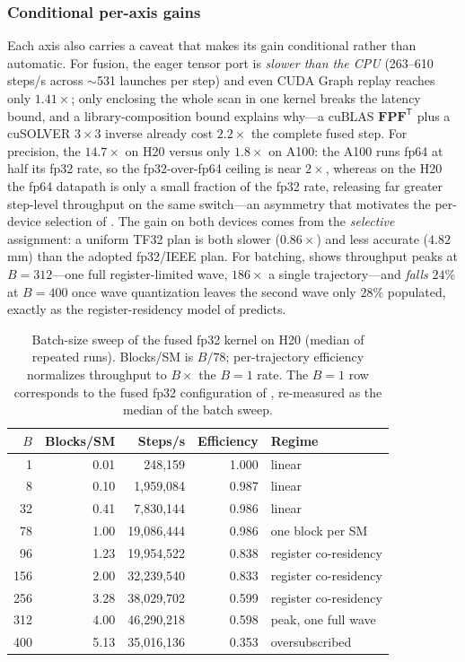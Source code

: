 \subsubsection{Conditional per-axis gains}
Each axis also carries a caveat that makes its gain conditional rather than automatic. For fusion, the eager tensor port is \emph{slower than the CPU} (263--610 steps/s across $\sim$531 launches per step) and even CUDA Graph replay reaches only $1.41\times$; only enclosing the whole scan in one kernel breaks the latency bound, and a library-composition bound explains why---a cuBLAS $\mathbf{F}\mathbf{P}\mathbf{F}^{\mathsf T}$ plus a cuSOLVER $3\times3$ inverse already cost $2.2\times$ the complete fused step. For precision, the $14.7\times$ on H20 versus only $1.8\times$ on A100: the A100 runs fp64 at half its fp32 rate, so the fp32-over-fp64 ceiling is near $2\times$, whereas on the H20 the fp64 datapath is only a small fraction of the fp32 rate, releasing far greater step-level throughput on the same switch---an asymmetry that motivates the per-device selection of . The gain on both devices comes from the \emph{selective} assignment: a uniform TF32 plan is both slower ($0.86\times$) and less accurate ($4.82$\,mm) than the adopted fp32/IEEE plan. For batching,  shows throughput peaks at $B{=}312$---one full register-limited wave, $186\times$ a single trajectory---and \emph{falls} $24\%$ at $B{=}400$ once wave quantization leaves the second wave only $28\%$ populated, exactly as the register-residency model of  predicts.


\begin{table}[!t]
  \centering
  \caption{Batch-size sweep of the fused fp32 kernel on H20 (median of repeated runs). Blocks/SM is $B/78$; per-trajectory efficiency normalizes throughput to $B\times$ the $B{=}1$ rate. The $B{=}1$ row corresponds to the fused fp32 configuration of , re-measured as the median of the batch sweep.}
  \label{tab:ablation-batch}
  \begin{tabular}{@{}rrrrl@{}}
    \toprule
    $B$ & Blocks/SM & Steps/s & Efficiency & Regime \\
    \midrule
    1 & 0.01 & 248,159 & 1.000 & linear \\
    8 & 0.10 & 1,959,084 & 0.987 & linear \\
    32 & 0.41 & 7,830,144 & 0.986 & linear \\
    78 & 1.00 & 19,086,444 & 0.986 & one block per SM \\
    96 & 1.23 & 19,954,522 & 0.838 & register co-residency \\
    156 & 2.00 & 32,239,540 & 0.833 & register co-residency \\
    256 & 3.28 & 38,029,702 & 0.599 & register co-residency \\
    312 & 4.00 & 46,290,218 & 0.598 & peak, one full wave \\
    400 & 5.13 & 35,016,136 & 0.353 & oversubscribed \\
    \bottomrule
  \end{tabular}
\end{table}

